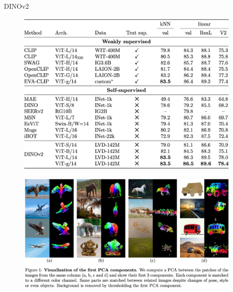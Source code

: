 \begin{frame}[allowframebreaks]{DINOv2}
\begin{figure}
    \centering
    \includegraphics[width=\linewidth,height=0.9\textheight,keepaspectratio]{images/contrastive/slide_95_1_img.png}
\end{figure}

\framebreak

\begin{figure}
    \centering
    \includegraphics[width=\linewidth,height=0.9\textheight,keepaspectratio]{images/contrastive/slide_96_1_img.png}
\end{figure}

\framebreak


\end{frame}
